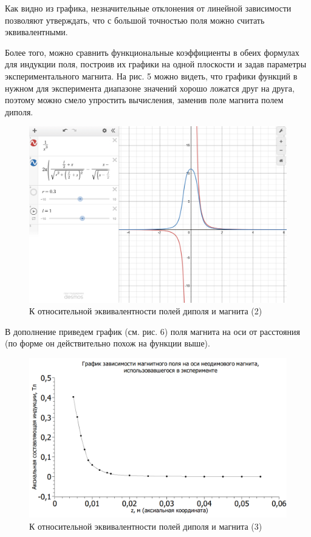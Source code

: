 \documentclass[a4paper,12pt]{article} %
\begin{document}
Как видно из графика, незначительные отклонения от линейной зависимости позволяют утверждать, что с большой точностью поля можно считать эквивалентными.

Более того, можно сравнить функциональные коэффициенты в обеих формулах для индукции поля, построив их графики на одной плоскости и задав параметры экспериментального магнита. На рис. 5 можно видеть, что графики функций в нужном для эксперимента диапазоне значений хорошо ложатся друг на друга, поэтому можно смело упростить вычисления, заменив поле магнита полем диполя.

\begin{figure}[h!]
	\centering
	\includegraphics[scale=0.19]{5.PNG}
	\caption{К относительной эквивалентности полей диполя и магнита (2)}
\end{figure}

В дополнение приведем график (см. рис. 6) поля магнита на оси от расстояния (по форме он действительно похож на функции выше).

\begin{figure}[h!]
	\centering
	\includegraphics[scale=0.8]{испр.png}
	\caption{К относительной эквивалентности полей диполя и магнита (3)}
\end{figure}
\end{document}

